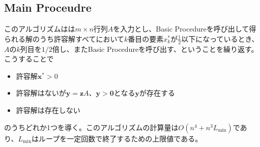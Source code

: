 \subsection{Main Proceudre}
このアルゴリズムはは$m \times n$行列$A$を入力とし、Basic Procedureを呼び出して得られる解のうち許容解すべてにおいて$k$番目の要素$x_k^*$が$\frac{1}{2}$以下になっているとき、$A$の$k$列目を$1 / 2$倍し、またBasic Procedureを呼び出す、ということを繰り返す。こうすることで
\begin{itemize}
  \item 許容解$\mathbf{x}^* > 0$
  \item 許容解はないが$\mathbf{y} = \mathbf{z} A、\mathbf{y} > \mathbf{0}$となる$\mathbf{y}$が存在する
  \item 許容解は存在しない
\end{itemize}
のうちどれか1つを導く。このアルゴリズムの計算量は$O(n^4 + n^3 L_{\text{min}})$であり、$L_{\text{min}}$はループを一定回数で終了するための上限値である。

